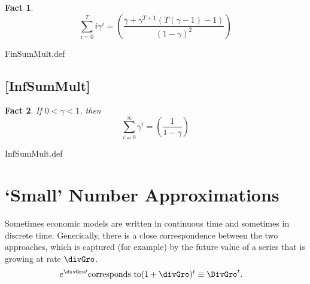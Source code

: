 \documentclass{handout}
\newtheorem{Fact}{Fact}
\providecommand{\currentpdfbookmark}{}
\begin{document}

\begin{Fact} 
\begin{equation}
\displaystyle \sum_{i=0}^{T} i \gamma^{i} = \left(\frac{\gamma + \gamma^{T+1}(T(\gamma-1)-1)}{(1-\gamma)^{2}}\right)
\end{equation} 
\end{Fact}

\begin{verbatimwrite}{FinSumMult.def}
\providecommand{\FinSumMult}{\href{https://www.econ2.jhu.edu/people/ccarroll/public/LectureNotes/MathFacts/MathFactsList\#FinSumMult}{\ensuremath{\mathtt{[FinSumMult]}}}}
\end{verbatimwrite}


\hypertarget{InfSumMult}{}

\subsection{[InfSumMult]}\label{fact:InfSumMult}


\begin{Fact} If $0 < \gamma < 1$, then 
\begin{equation}
\displaystyle \sum_{i=0}^{\infty} \gamma^{i} = \left(\frac{1}{1-\gamma}\right)
\end{equation}
\end{Fact}

\begin{verbatimwrite}{InfSumMult.def}
\providecommand{\InfSumMult}{\href{https://www.econ2.jhu.edu/people/ccarroll/public/LectureNotes/MathFacts/MathFactsList\#InfSumMult}{\ensuremath{\mathtt{[InfSumMult]}}}}
\end{verbatimwrite}

\medskip\medskip

\section{`Small' Number Approximations}

Sometimes economic models are written in continuous time and sometimes
in discrete time.  Generically, there is a close
correspondence between the two approaches, which is captured (for
example) by the future value of a series that is growing at rate
$\divGro$.  
\begin{equation}\begin{gathered}\begin{aligned}
  e^{\divGro t} & \text{corresponds to}  (1+\divGro)^{t} \equiv \DivGro^{t}.
\end{aligned}\end{gathered}\end{equation}
\end{document}
